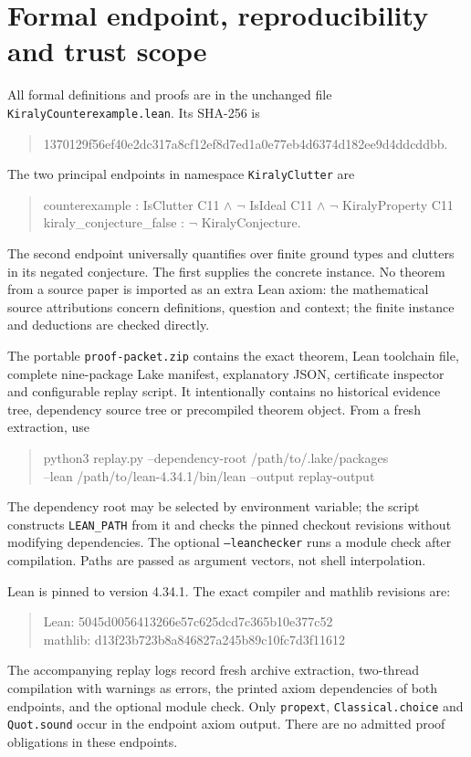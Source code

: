 \documentclass[11pt]{article}
\begin{document}
\section{Formal endpoint, reproducibility and trust scope}
All formal definitions and proofs are in the unchanged file
\texttt{KiralyCounterexample.lean}. Its SHA-256 is
\begin{quote}\small\ttfamily
1370129f56ef40e2dc317a8cf12ef8d7ed1a0e77eb4d6374d182ee9d4ddcddbb.
\end{quote}
The two principal endpoints in namespace \texttt{KiralyClutter} are
\begin{quote}\small\ttfamily
counterexample : IsClutter C11 $\land$ $\neg$ IsIdeal C11 $\land$ $\neg$ KiralyProperty C11\\
kiraly\_conjecture\_false : $\neg$ KiralyConjecture.
\end{quote}
The second endpoint universally quantifies over finite ground types and clutters in its negated conjecture. The first supplies the concrete instance. No theorem from a source paper is imported as an extra Lean axiom: the mathematical source attributions concern definitions, question and context; the finite instance and deductions are checked directly.

The portable \texttt{proof-packet.zip} contains the exact theorem, Lean toolchain file, complete nine-package Lake manifest, explanatory JSON, certificate inspector and configurable replay script. It intentionally contains no historical evidence tree, dependency source tree or precompiled theorem object. From a fresh extraction, use
\begin{quote}\small\ttfamily
python3 replay.py --dependency-root /path/to/.lake/packages \\
\hspace*{1em}--lean /path/to/lean-4.34.1/bin/lean --output replay-output
\end{quote}
The dependency root may be selected by environment variable; the script constructs \texttt{LEAN\_PATH} from it and checks the pinned checkout revisions without modifying dependencies. The optional \texttt{--leanchecker} runs a module check after compilation. Paths are passed as argument vectors, not shell interpolation.

Lean is pinned to version 4.34.1. The exact compiler and mathlib revisions are:
\begin{quote}\small\ttfamily
Lean: 5045d0056413266e57c625dcd7c365b10e377c52\\
mathlib: d13f23b723b8a846827a245b89c10fc7d3f11612
\end{quote}
The accompanying replay logs record fresh archive extraction, two-thread compilation with warnings as errors, the printed axiom dependencies of both endpoints, and the optional module check. Only \texttt{propext}, \texttt{Classical.choice} and \texttt{Quot.sound} occur in the endpoint axiom output. There are no admitted proof obligations in these endpoints.
\end{document}
